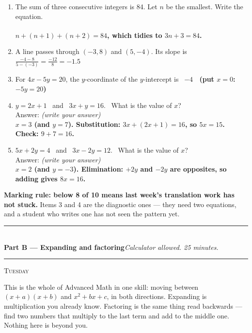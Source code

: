 \documentclass[11pt,a4paper]{article}
\newif\ifANSWERS
\newcommand{\PartHead}[2]{%
  \vspace{6pt}
  {\color{navy}\rule{\textwidth}{0.8pt}}\\[2pt]
  {\large\bfseries\color{navy}#1}\hfill{\small\itshape #2}\\[-4pt]
  {\color{navy}\rule{\textwidth}{0.4pt}}
  \vspace{4pt}
}
\newcommand{\sitting}[1]{{\footnotesize\textsc{\color{navy}#1}}\par\vspace{2pt}}
\newcommand{\spr}{\\[3pt]\hspace*{6pt}Answer: \underline{\hspace{3.2cm}}\hfill{\footnotesize\itshape(write your answer)}}
\newcommand{\ans}[1]{\ {\color{keyred}\bfseries #1}}
\newcommand{\note}[1]{\par{\footnotesize\color{keyred}#1}}
\newcommand{\ans}[1]{}
\newcommand{\note}[1]{}
\begin{document}
\begin{enumerate}[leftmargin=20pt,itemsep=7pt]
\item The sum of three consecutive integers is 84. Let $n$ be the smallest. Write the equation.\ifANSWERS\else\\
  \underline{\hspace{\linewidth}}\fi
  \ans{\\ $n+(n+1)+(n+2)=84$, which tidies to $3n+3=84$.}

\item A line passes through $(-3,8)$ and $(5,-4)$. Its slope is \ifANSWERS\else\underline{\hspace{2cm}}\fi \ans{$\frac{-4-8}{5-(-3)}=\frac{-12}{8}=-1.5$}

\item For $4x-5y=20$, the $y$-coordinate of the $y$-intercept is \ifANSWERS\else\underline{\hspace{2cm}}\fi \ans{$-4$ \ (put $x=0$: $-5y=20$)}

\item $y=2x+1$ \ and \ $3x+y=16$. \ What is the value of $x$? \spr
  \ans{\\ $x=3$ (and $y=7$). Substitution: $3x+(2x+1)=16$, so $5x=15$. Check: $9+7=16$.}

\item $5x+2y=4$ \ and \ $3x-2y=12$. \ What is the value of $x$? \spr
  \ans{\\ $x=2$ (and $y=-3$). Elimination: $+2y$ and $-2y$ are opposites, so adding gives $8x=16$.}
\end{enumerate}

\note{\textbf{Marking rule: below 8 of 10 means last week's translation work has not stuck.} Items 3 and 4 are the diagnostic ones --- they need two equations, and a student who writes one has not seen the pattern yet.}

\PartHead{Part B --- Expanding and factoring}{Calculator allowed. 25 minutes.}
\sitting{Tuesday}
This is the whole of Advanced Math in one skill: moving between $(x+a)(x+b)$ and
$x^2+bx+c$, in both directions. Expanding is multiplication you already know.
Factoring is the same thing read backwards --- find two numbers that multiply to the
last term and add to the middle one. Nothing here is beyond you.
\end{document}

